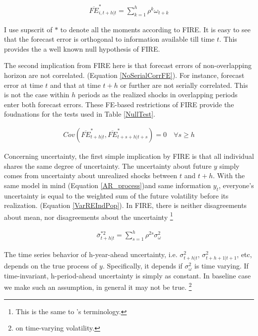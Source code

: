 \documentclass[]{article}
\begin{document}
	\begin{eqnarray}\label{NoPastInfFE}
		\overline{FE}^{*}_{i,t+h|t} = \sum^{h}_{k=1} \rho^k \omega_{t+k}
	\end{eqnarray}
	
	I use supscrit of $*$ to denote all the moments according to FIRE. It is easy to see that the forecast error is orthogonal to information available till time $t$. This provides the a well known null hypothesis of FIRE.
	
	The second implication from FIRE here is that forecast errors of non-overlapping horizon are not correlated. (Equation \ref{NoSerialCorrFE}). For instance, forecast error at time $t$ and that at time $t+h$ or further are not serially correlated. This is not the case within $h$ periods as the realized shocks in overlapping periods enter both forecast errors.  These FE-based restrictions of FIRE provide the foudnations for the tests used in Table \ref{NullTest}. 
	
	\begin{eqnarray}\label{NoSerialCorrFE}
		Cov(\overline{FE}^{*}_{t+h|t}, \overline{FE}^{*}_{t+s+h|t+s}) = 0 \quad \forall s \geq h
	\end{eqnarray}
	
	Concerning uncertainty, the first simple implication by FIRE is that all individual shares the same degree of uncertainty. The uncertainty about future $y$ simply comes from uncertainty about unrealized shocks between $t$ and $t+h$. With the same model in mind (Equation \ref{AR_process})and same information $y_t$, everyone's uncertainty is equal to the weighted sum of the future volatility before its realization. (Equation \ref{VarREIndPop}). In FIRE, there is neither disagreements about mean, nor disagreements about the uncertainty \footnote{This is the same to \citet{jurado2015measuring}'s terminology.} 
	
	\begin{eqnarray}\label{VarREIndPop}
		\bar \sigma^{*2}_{t+h|t} = \sum^{h}_{s=1}\rho^{2s} \sigma^2_{\omega}
	\end{eqnarray}
	
	The time series behavior of h-year-ahead uncertainty, i.e. $\sigma^2_{t+h|t}$, $\sigma^2_{t+h+1|t+1}$, etc, depends on the true process of $y$. Specifically, it depends if $\sigma^2_\omega$ is time varying. If time-invariant, h-period-ahead uncertainty is simply as constant. In baseline case we make such an assumption, in general it may not be true. \footnote{\citet{xx} on time-varying volatility.} 
	
\end{document}
